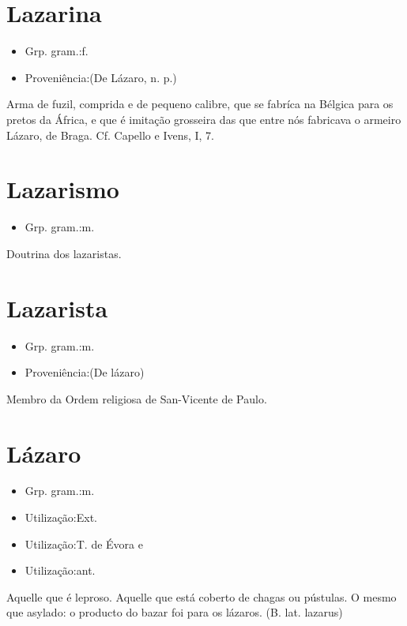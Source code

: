 \section{Lazarina}
\begin{itemize}
\item {Grp. gram.:f.}
\end{itemize}
\begin{itemize}
\item {Proveniência:(De \textunderscore Lázaro\textunderscore , n. p.)}
\end{itemize}
Arma de fuzil, comprida e de pequeno calibre, que se fabríca na Bélgica para os pretos da África, e que é imitação grosseira das que entre nós fabricava o armeiro Lázaro, de Braga. Cf. Capello e Ivens, I, 7.
\section{Lazarismo}
\begin{itemize}
\item {Grp. gram.:m.}
\end{itemize}
Doutrina dos lazaristas.
\section{Lazarista}
\begin{itemize}
\item {Grp. gram.:m.}
\end{itemize}
\begin{itemize}
\item {Proveniência:(De \textunderscore lázaro\textunderscore )}
\end{itemize}
Membro da Ordem religiosa de San-Vicente de Paulo.
\section{Lázaro}
\begin{itemize}
\item {Grp. gram.:m.}
\end{itemize}
\begin{itemize}
\item {Utilização:Ext.}
\end{itemize}
\begin{itemize}
\item {Utilização:T. de Évora  e}
\end{itemize}
\begin{itemize}
\item {Utilização:ant.}
\end{itemize}
Aquelle que é leproso.
Aquelle que está coberto de chagas ou pústulas.
O mesmo que \textunderscore asylado\textunderscore : \textunderscore o producto do bazar foi para os lázaros\textunderscore .
(B. lat. \textunderscore lazarus\textunderscore )
